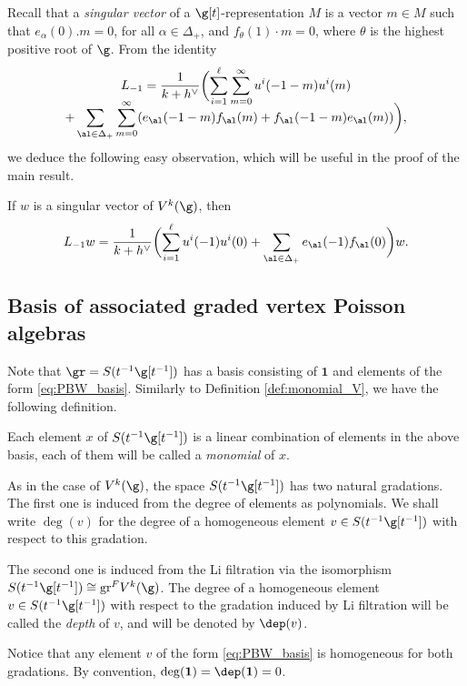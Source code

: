 Recall that a \emph{singular vector} of a $\g[t]$-representation $M$
is a vector $m \in M$
such that $e_{\alpha}(0).m=0$, for all $\alpha \in {\Delta}_{+}$,
and $f_\theta(1)\cdot m=0$, where $\theta$ is the highest positive root of $\g$.
From the identity
\begin{multline*}
L_{-1}=
\dfrac{1}{k+h^\vee} \biggl(\sum_{i=1}^{\ell}\sum_{m=0}^{\infty} u^i(-1-m) u^i(m)\\[-8pt]
+\sum_{\al\in{\Delta}_{+}}\sum_{m=0}^{\infty}
(e_{\al}(-1-m)f_{\al}(m)+f_{\al}(-1-m)e_{\al}(m))\biggr),
\end{multline*}
we deduce the following easy observation, which will be useful
in the proof of the main result.

\begin{lem}
\label{lem:Sugawara_singular_vector}
If $w$ is a singular vector of $V^k(\g)$,
then
\[
L_{-1} w=\dfrac{1}{k+h^\vee} \biggl(\sum_{i=1}^{\ell}u^i(-1)u^i(0)
+\sum_{\al\in{\Delta}_{+}}e_{\al}(-1)f_{\al}(0)\biggr) w.
\]
\end{lem}
\subsection{Basis of associated graded vertex Poisson algebras}

Note that $\gr=S(t^{-1}\g[t^{-1}])$ has a basis consisting
of $\mathbf{1}$ and elements of the form \eqref{eq:PBW_basis}.
Similarly to Definition \ref{def:monomial_V}, we have the following
definition.

\begin{defn}
\label{def:monomial_S}
Each element $x$ of $S(t^{-1}\g[t^{-1}])$
is a linear combination of elements in the above basis,
each of them will be called a \emph{monomial} of $x$.
\end{defn}

{As in the case of $V^k(\g)$,}
the space $S(t^{-1}\g[t^{-1}])$ has two natural gradations.
The first one is induced from the degree of elements as
polynomials.
We shall write $\deg(v)$ for the degree of a homogeneous
element $v \in S(t^{-1}\g[t^{-1}])$ with respect to this gradation.

The second one is induced from the Li filtration via the isomorphism
$S(t^{-1}\g[t^{-1}]) \cong \mathrm{gr}^F V^k(\g)$.
The degree of a homogeneous
element $v \in S(t^{-1}\g[t^{-1}])$ with respect to the gradation
induced by Li filtration
will be called the \emph{depth} of $v$, and will be denoted by $\dep(v)$.

Notice that any element $v$ of the form \eqref{eq:PBW_basis} is homogeneous
for both gradations.
By convention, $\deg(\mathbf{1})=\dep(\mathbf{1})=0$.

